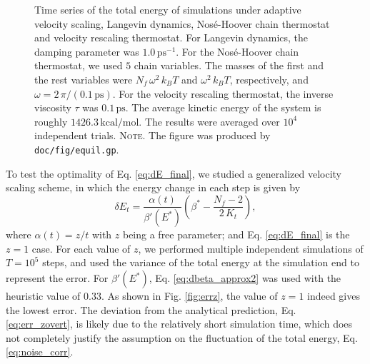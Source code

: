 \documentclass[reprint]{revtex4-1}
\newcommand{\red}[1]{{\color{red} #1}}
\newcommand{\note}[1]{{\color{DarkGreen}\footnotesize \textsc{Note.} #1}}
\begin{document}
\begin{figure}[h]
\begin{center}
  \caption{
    \label{fig:equil}
    Time series of the total energy
    of simulations under
    adaptive velocity scaling,
    Langevin dynamics,
    Nos\'e-Hoover chain thermostat
    and
    velocity rescaling thermostat.
    For Langevin dynamics,
    the damping parameter was $1.0 \, \mathrm{ps}^{-1}$.
    For the Nos\'e-Hoover chain thermostat,
    we used $5$ chain variables. The masses
    of the first and the rest variables
    were $N_f \, \omega^2 \, k_B T$ and
    $\omega^2 \, k_B T$, respectively\cite{martyna1992},
    and
    $\omega = 2 \,\pi/(0.1 \, \mathrm{ps})$.
    For the velocity rescaling thermostat,
    the inverse viscosity $\tau$ was $0.1 \, \mathrm{ps}$.
    The average kinetic energy of the system
    is roughly $1426.3 \, \mathrm{kcal/mol}$.
    \red{The results were averaged over $10^4$ independent trials.}
    \note{The figure was produced by \texttt{doc/fig/equil.gp}.
    }%
  }
\end{center}
\end{figure}





To test the optimality of Eq. \eqref{eq:dE_final},
we studied a generalized velocity scaling scheme,
in which the energy change in each step is given by
%
\begin{equation}
  \delta E_t
  =
  \frac{ \alpha(t) } { \beta'(E^*) }
  \left(
   \beta^* -
   \frac{ N_f - 2 }
   { 2 \, K_t }
  \right)
  ,
  \label{eq:dE_mod}
\end{equation}
%
where $\alpha(t) = z/t$ with $z$ being a free parameter;
and Eq. \eqref{eq:dE_final} is the $z = 1$ case.
%
For each value of $z$,
we performed multiple independent simulations of $T = 10^5$ steps,
and used the variance of the total energy at the simulation end
to represent the error.
%
For $\beta'(E^*)$,
Eq. \eqref{eq:dbeta_approx2} was used with the heuristic value of $0.33$.
%
As shown in Fig. \ref{fig:errz},
the value of $z = 1$
indeed gives the lowest error.
%
The deviation from the analytical prediction,
Eq. \eqref{eq:err_zovert},
is likely due to the relatively short simulation time,
which does not completely justify the assumption
on the fluctuation of the total energy, Eq. \eqref{eq:noise_corr}.
\end{document}
